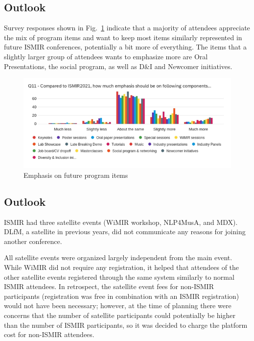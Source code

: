 \documentclass[%
10pt,								%
]
{scrartcl}
\begin{document}
    \subsection{Outlook}
        Survey responses shown in Fig.~\ref{fig:survey_future} indicate that a majority of attendees appreciate the mix of program items and want to keep most items similarly represented in future ISMIR conferences, potentially a bit more of everything. The items that a slightly larger group of attendees wants to emphasize more are Oral Presentations, the social program, as well as D\&I and Newcomer initiatives.
          \begin{figure}%
            \includegraphics[width=\columnwidth]{fig/survey_future}%
            \caption{Emphasis on future program items}%
            \label{fig:survey_future}%
        \end{figure}

    \subsection{Outlook}
        ISMIR had three satellite events (WiMIR workshop, NLP4MusA, and MDX). DLfM, a satellite in previous years, did not communicate any reasons for joining another conference.

        All satellite events were organized largely independent from the main event. While WiMIR did not require any registration, it helped that attendees of the other satellite events registered through the same system similarly to normal ISMIR attendees. In retrospect, the satellite event fees for non-ISMIR participants (registration was free in combination with an ISMIR registration) would not have been necessary; however, at the time of planning there were concerns that the number of satellite participants could potentially be higher than the number of ISMIR participants, so it was decided to charge the platform cost for non-ISMIR attendees.

      
\end{document}
